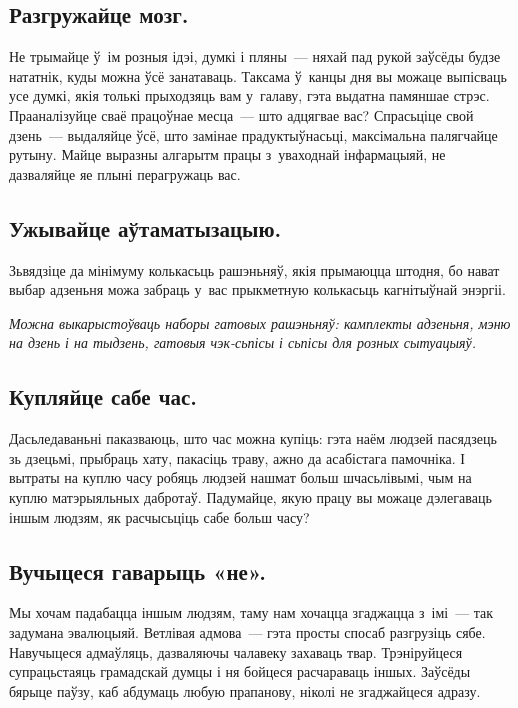 \subsection*{Разгружайце мозг.}

Не трымайце ў~ім розныя ідэі, думкі і пляны~--- няхай пад рукой заўсёды будзе нататнік, куды можна ўсё занатаваць. Таксама ў~канцы дня вы можаце выпісваць усе думкі, якія толькі прыходзяць вам у~галаву, гэта выдатна памяншае стрэс. Прааналізуйце сваё працоўнае месца~--- што адцягвае вас? Спрасьціце свой дзень~--- выдаляйце ўсё, што замінае прадуктыўнасьці, максімальна палягчайце рутыну. Майце выразны алгарытм працы з~уваходнай інфармацыяй, не дазваляйце яе плыні перагружаць вас. 


\subsection*{Ужывайце аўтаматызацыю.}

Зьвядзіце да мінімуму колькасьць рашэньняў, якія прымаюцца штодня, бо нават выбар адзеньня можа забраць у~вас прыкметную колькасьць кагнітыўнай энэргіі. 

\emph{Можна выкарыстоўваць наборы гатовых рашэньняў: камплекты адзеньня, мэню на дзень і на тыдзень, гатовыя чэк-сьпісы і сьпісы для розных сытуацыяў.}

\subsection*{Купляйце сабе час.}

Дасьледаваньні паказваюць, што час можна купіць: гэта наём людзей пасядзець зь дзецьмі, прыбраць хату, пакасіць траву, ажно да асабістага памочніка. І вытраты на куплю часу робяць людзей нашмат больш шчасьлівымі, чым на куплю матэрыяльных дабротаў. Падумайце, якую працу вы можаце дэлегаваць іншым людзям, як расчысьціць сабе больш часу?

\subsection*{Вучыцеся гаварыць «не».}

Мы хочам падабацца іншым людзям, таму нам хочацца згаджацца з~імі~--- так задумана эвалюцыяй. Ветлівая адмова~--- гэта просты спосаб разгрузіць сябе. Навучыцеся адмаўляць, дазваляючы чалавеку захаваць твар. Трэніруйцеся супрацьстаяць грамадскай думцы і ня бойцеся расчараваць іншых. Заўсёды бярыце паўзу, каб абдумаць любую прапанову, ніколі не згаджайцеся адразу.

